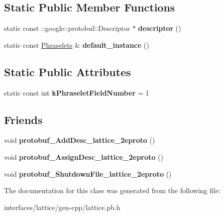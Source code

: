 \subsection*{Static Public Member Functions}
\begin{DoxyCompactItemize}
\item 
\hypertarget{classlattice_1_1Phraselets_abf419edd9478af3a33819c3ddce2c405}{
static const ::google::protobuf::Descriptor $\ast$ {\bfseries descriptor} ()}
\label{classlattice_1_1Phraselets_abf419edd9478af3a33819c3ddce2c405}

\item 
\hypertarget{classlattice_1_1Phraselets_a68660f6c68cddcc3ebaf0f6b245eaed8}{
static const \hyperlink{classlattice_1_1Phraselets}{Phraselets} \& {\bfseries default\_\-instance} ()}
\label{classlattice_1_1Phraselets_a68660f6c68cddcc3ebaf0f6b245eaed8}

\end{DoxyCompactItemize}
\subsection*{Static Public Attributes}
\begin{DoxyCompactItemize}
\item 
\hypertarget{classlattice_1_1Phraselets_ad69aa77b37a4d6f3d2c61fd9aaa09fd8}{
static const int {\bfseries kPhraseletFieldNumber} = 1}
\label{classlattice_1_1Phraselets_ad69aa77b37a4d6f3d2c61fd9aaa09fd8}

\end{DoxyCompactItemize}
\subsection*{Friends}
\begin{DoxyCompactItemize}
\item 
\hypertarget{classlattice_1_1Phraselets_a19e63fb37025879e023cad88064187cf}{
void {\bfseries protobuf\_\-AddDesc\_\-lattice\_\-2eproto} ()}
\label{classlattice_1_1Phraselets_a19e63fb37025879e023cad88064187cf}

\item 
\hypertarget{classlattice_1_1Phraselets_a3b0386e09a9fefcf1bdce658cfc480b2}{
void {\bfseries protobuf\_\-AssignDesc\_\-lattice\_\-2eproto} ()}
\label{classlattice_1_1Phraselets_a3b0386e09a9fefcf1bdce658cfc480b2}

\item 
\hypertarget{classlattice_1_1Phraselets_a3c7b187721d0704ceb19ff889729d35a}{
void {\bfseries protobuf\_\-ShutdownFile\_\-lattice\_\-2eproto} ()}
\label{classlattice_1_1Phraselets_a3c7b187721d0704ceb19ff889729d35a}

\end{DoxyCompactItemize}


The documentation for this class was generated from the following file:\begin{DoxyCompactItemize}
\item 
interfaces/lattice/gen-\/cpp/lattice.pb.h\end{DoxyCompactItemize}
